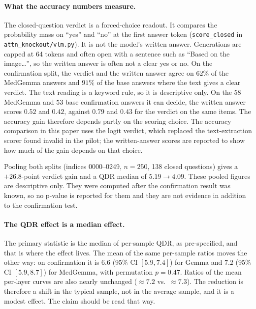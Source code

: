 \paragraph{What the accuracy numbers measure.} The closed-question verdict is a
forced-choice readout. It compares the probability mass on ``yes'' and ``no'' at the first
answer token (\texttt{score\_closed} in \texttt{attn\_knockout/vlm.py}). It is not the
model's written answer. Generations are capped at 64 tokens and often open with a sentence
such as ``Based on the image\ldots'', so the written answer is often not a clear yes or no.
On the confirmation split, the verdict and the written answer agree on $62\%$ of the
MedGemma answers and $91\%$ of the base answers where the text gives a clear verdict. The
text reading is a keyword rule, so it is descriptive only. On the $58$ MedGemma and $53$
base confirmation answers it can decide, the written answer scores $0.52$ and $0.42$, against
$0.79$ and $0.43$ for the verdict on the same items. The accuracy gain therefore depends
partly on the scoring choice. The accuracy comparison in this paper uses the logit verdict,
which replaced the text-extraction scorer found invalid in the pilot; the written-answer scores
are reported to show how much of the gain depends on that choice.

Pooling both splits (indices 0000--0249, $n{=}250$, 138 closed questions) gives a
$+26.8$-point verdict gain and a QDR median of $5.19 \to 4.09$. These pooled figures are
descriptive only. They were computed after the confirmation result was known, so no
p-value is reported for them and they are not evidence in addition to the confirmation
test.

\paragraph{The QDR effect is a median effect.} The primary statistic is the median of
per-sample QDR, as pre-specified, and that is where the effect lives. The mean of the
same per-sample ratios moves the other way: on confirmation it is $6.6$ (95\% CI
$[5.9, 7.4]$) for Gemma and $7.2$ (95\% CI $[5.9, 8.7]$) for MedGemma, with permutation
$p{=}0.47$. Ratios of the mean per-layer curves are also nearly unchanged ($\approx7.2$
vs.\ $\approx7.3$). The reduction is therefore a shift in the typical sample, not in the
average sample, and it is a modest effect. The claim should be read that way.

